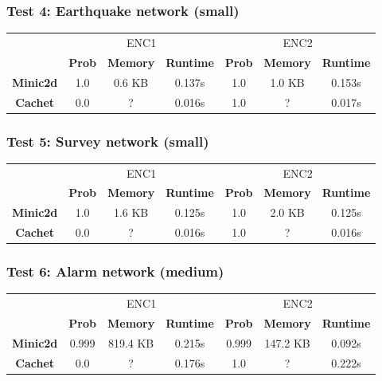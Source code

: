 \subsubsection{Test 4: Earthquake network (small)}
\begin{table}[H]
    \centering
    \begin{tabular}{c|c|c|c|c|c|c|}
    \cline{2-7}
            & \multicolumn{3}{c|}{ENC1} & \multicolumn{3}{c|}{ENC2} \\ \cline{2-7}
      & \textbf{Prob}  & \textbf{Memory}  & \textbf{Runtime} & \textbf{Prob}  & \textbf{Memory}  & \textbf{Runtime} \\ \cline{1-7}
      \textbf{Minic2d} & 1.0  & 0.6 KB & 0.137s   & 1.0    & 1.0 KB  & 	0.153s \\
      \hline
    \textbf{Cachet}  & 0.0  & ?    & 0.016s       & 1.0     & ?    & 0.017s    \\ \cline{1-7}
    \end{tabular}
\end{table}

\subsubsection{Test 5: Survey network (small)}
\begin{table}[H]
\centering
    \begin{tabular}{c|c|c|c|c|c|c|}
    \cline{2-7}
            & \multicolumn{3}{c|}{ENC1} & \multicolumn{3}{c|}{ENC2} \\ \cline{2-7}
      & \textbf{Prob}  & \textbf{Memory}  & \textbf{Runtime} & \textbf{Prob}  & \textbf{Memory}  & \textbf{Runtime} \\ \cline{1-7}
      \textbf{Minic2d} & 1.0  & 1.6 KB    & 0.125s   & 1.0    & 2.0 KB    & 	0.125s \\
      \hline
    \textbf{Cachet}  & 0.0  & ?    & 0.016s       & 1.0     & ?    & 0.016s    \\ \cline{1-7}
    \end{tabular}
\end{table}

\subsubsection{Test 6: Alarm network (medium)}
\begin{table}[H]
    \centering
    \begin{tabular}{c|c|c|c|c|c|c|}
    \cline{2-7}
            & \multicolumn{3}{c|}{ENC1} & \multicolumn{3}{c|}{ENC2} \\ \cline{2-7}
      & \textbf{Prob}  & \textbf{Memory}  & \textbf{Runtime} & \textbf{Prob}  & \textbf{Memory}  & \textbf{Runtime} \\ \cline{1-7}
      \textbf{Minic2d} & 0.999  & 819.4 KB    & 0.215s   & 0.999    & 147.2 KB    & 	0.092s \\
      \hline
    \textbf{Cachet}  & 0.0  & ?    & 0.176s       & 1.0     & ?    & 0.222s    \\ \cline{1-7}
\end{tabular}
\end{table}

